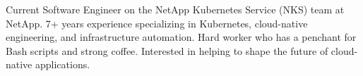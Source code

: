 

\begin{cvparagraph}

Current Software Engineer on the NetApp Kubernetes Service (NKS) team at NetApp. 7+ years experience specializing in Kubernetes, cloud-native engineering, and infrastructure automation. Hard worker who has a penchant for Bash scripts and strong coffee. Interested in helping to shape the future of cloud-native applications.
\end{cvparagraph}
